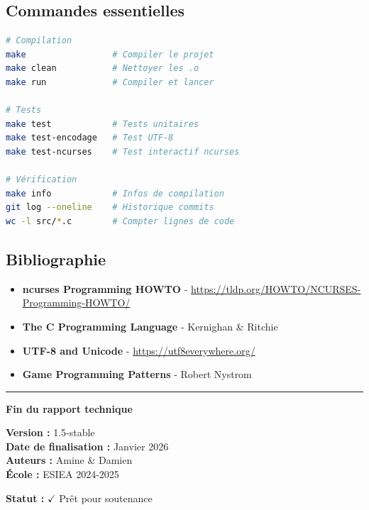 \documentclass[12pt,a4paper]{article}
\begin{document}
\subsection*{Commandes essentielles}

\begin{lstlisting}[language=bash, frame=single]
# Compilation
make                 # Compiler le projet
make clean           # Nettoyer les .o
make run             # Compiler et lancer

# Tests
make test            # Tests unitaires
make test-encodage   # Test UTF-8
make test-ncurses    # Test interactif ncurses

# Vérification
make info            # Infos de compilation
git log --oneline    # Historique commits
wc -l src/*.c        # Compter lignes de code
\end{lstlisting}

\subsection*{Bibliographie}

\begin{itemize}
    \item \textbf{ncurses Programming HOWTO} - \url{https://tldp.org/HOWTO/NCURSES-Programming-HOWTO/}
    \item \textbf{The C Programming Language} - Kernighan \& Ritchie
    \item \textbf{UTF-8 and Unicode} - \url{https://utf8everywhere.org/}
    \item \textbf{Game Programming Patterns} - Robert Nystrom
\end{itemize}


\vfill

\begin{center}
\hrule
\vspace{0.5cm}
\textbf{Fin du rapport technique}

\vspace{0.3cm}
\textbf{Version :} 1.5-stable \\
\textbf{Date de finalisation :} Janvier 2026 \\
\textbf{Auteurs :} Amine \& Damien \\
\textbf{École :} ESIEA 2024-2025

\vspace{0.3cm}
\textbf{Statut :} $\checkmark$ Prêt pour soutenance
\end{center}
\end{document}
